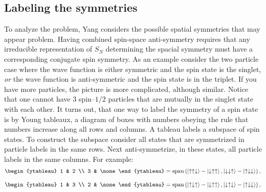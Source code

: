 \subsection{Labeling the symmetries}
To analyze the problem, Yang considers the possible spatial symmetries that may appear problem. Having combined spin-space anti-symmetry requires that any irreducible representation of $ S_N$ determining the spacial symmetry must have a corresponding conjugate spin symmetry. As an example consider the two particle case where the wave function is either symmetric and the spin state is the singlet, \emph{or} the wave function is anti-symmetric and the spin state is in the triplet. If you have more particles, the picture is more complicated, although similar. Notice that one cannot have $ 3 $ spin--$ 1/2 $ particles that are mutually in the singlet state with each other. It turns out, that one way to label the symmetry of a spin state is by Young tableaux, \ie a diagram of boxes with numbers obeying the rule that numbers increase along all rows and columns. A tableau labels a subspace of spin states. To construct the subspace consider all states that are symmetrized in particle labels in the same rows. Next anti-symmetrize, in these states, all particle labels in the same columns. For example: \begin{equation}
\begin{ytableau}
1 & 2 \\
3 &  \none 
\end{ytableau}=\Span{\ket{\uparrow \uparrow \downarrow }-\ket{\downarrow \uparrow \uparrow},\ket{\downarrow\downarrow\uparrow}-\ket{\uparrow\downarrow\downarrow}},
\end{equation}

\begin{equation}
\begin{ytableau}
1 & 3 \\
2 &  \none 
\end{ytableau}=\Span{\ket{\uparrow \downarrow \uparrow }-\ket{\downarrow \uparrow \uparrow},\ket{\downarrow \uparrow \downarrow }-\ket{\uparrow \downarrow \downarrow}},
\end{equation}


